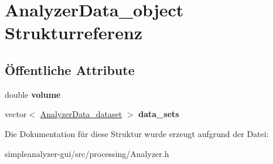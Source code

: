 \hypertarget{structAnalyzerData__object}{\section{Analyzer\-Data\-\_\-object Strukturreferenz}
\label{structAnalyzerData__object}
}
\subsection*{Öffentliche Attribute}
\begin{DoxyCompactItemize}
\item 
\hypertarget{structAnalyzerData__object_a3f697bd0d526805d353054a3b2589c98}{double {\bfseries volume}}\label{structAnalyzerData__object_a3f697bd0d526805d353054a3b2589c98}

\item 
\hypertarget{structAnalyzerData__object_a4b82dd4128ae84dbc0422a6155254e2e}{vector$<$ \hyperlink{structAnalyzerData__dataset}{Analyzer\-Data\-\_\-dataset} $>$ {\bfseries data\-\_\-sets}}\label{structAnalyzerData__object_a4b82dd4128ae84dbc0422a6155254e2e}

\end{DoxyCompactItemize}


Die Dokumentation für diese Struktur wurde erzeugt aufgrund der Datei\-:\begin{DoxyCompactItemize}
\item 
simpleanalyzer-\/gui/src/processing/Analyzer.\-h\end{DoxyCompactItemize}
